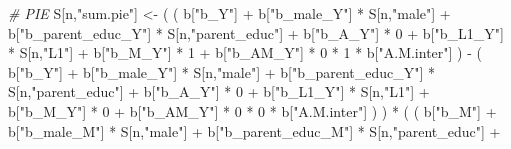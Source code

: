 \documentclass[
]{book}
\newenvironment{Shaded}{\begin{snugshade}}{\end{snugshade}}
\newcommand{\CommentTok}[1]{\textcolor[rgb]{0.56,0.35,0.01}{\textit{#1}}}
\newcommand{\DecValTok}[1]{\textcolor[rgb]{0.00,0.00,0.81}{#1}}
\newcommand{\NormalTok}[1]{#1}
\newcommand{\OtherTok}[1]{\textcolor[rgb]{0.56,0.35,0.01}{#1}}
\newcommand{\SpecialCharTok}[1]{\textcolor[rgb]{0.00,0.00,0.00}{#1}}
\newcommand{\StringTok}[1]{\textcolor[rgb]{0.31,0.60,0.02}{#1}}
\begin{document}
\begin{Shaded}
\begin{Highlighting}[]
    \CommentTok{\# PIE }
\NormalTok{    S[n,}\StringTok{"sum.pie"}\NormalTok{] }\OtherTok{\textless{}{-}}\NormalTok{ ( ( b[}\StringTok{"b\_Y"}\NormalTok{] }\SpecialCharTok{+} 
\NormalTok{                            b[}\StringTok{"b\_male\_Y"}\NormalTok{] }\SpecialCharTok{*}\NormalTok{ S[n,}\StringTok{"male"}\NormalTok{] }\SpecialCharTok{+} 
\NormalTok{                            b[}\StringTok{"b\_parent\_educ\_Y"}\NormalTok{] }\SpecialCharTok{*}\NormalTok{ S[n,}\StringTok{"parent\_educ"}\NormalTok{] }\SpecialCharTok{+} 
\NormalTok{                            b[}\StringTok{"b\_A\_Y"}\NormalTok{] }\SpecialCharTok{*} \DecValTok{0} \SpecialCharTok{+} 
\NormalTok{                            b[}\StringTok{"b\_L1\_Y"}\NormalTok{] }\SpecialCharTok{*}\NormalTok{ S[n,}\StringTok{"L1"}\NormalTok{] }\SpecialCharTok{+}
\NormalTok{                            b[}\StringTok{"b\_M\_Y"}\NormalTok{] }\SpecialCharTok{*} \DecValTok{1} \SpecialCharTok{+}
\NormalTok{                            b[}\StringTok{"b\_AM\_Y"}\NormalTok{] }\SpecialCharTok{*} \DecValTok{0} \SpecialCharTok{*} \DecValTok{1} \SpecialCharTok{*}\NormalTok{ b[}\StringTok{"A.M.inter"}\NormalTok{] ) }\SpecialCharTok{{-}} 
\NormalTok{                          ( b[}\StringTok{"b\_Y"}\NormalTok{] }\SpecialCharTok{+} 
\NormalTok{                              b[}\StringTok{"b\_male\_Y"}\NormalTok{] }\SpecialCharTok{*}\NormalTok{ S[n,}\StringTok{"male"}\NormalTok{] }\SpecialCharTok{+} 
\NormalTok{                              b[}\StringTok{"b\_parent\_educ\_Y"}\NormalTok{] }\SpecialCharTok{*}\NormalTok{ S[n,}\StringTok{"parent\_educ"}\NormalTok{] }\SpecialCharTok{+} 
\NormalTok{                              b[}\StringTok{"b\_A\_Y"}\NormalTok{] }\SpecialCharTok{*} \DecValTok{0} \SpecialCharTok{+} 
\NormalTok{                              b[}\StringTok{"b\_L1\_Y"}\NormalTok{] }\SpecialCharTok{*}\NormalTok{ S[n,}\StringTok{"L1"}\NormalTok{] }\SpecialCharTok{+}
\NormalTok{                              b[}\StringTok{"b\_M\_Y"}\NormalTok{] }\SpecialCharTok{*} \DecValTok{0} \SpecialCharTok{+}
\NormalTok{                              b[}\StringTok{"b\_AM\_Y"}\NormalTok{] }\SpecialCharTok{*} \DecValTok{0} \SpecialCharTok{*} \DecValTok{0} \SpecialCharTok{*}\NormalTok{ b[}\StringTok{"A.M.inter"}\NormalTok{] ) ) }\SpecialCharTok{*}
\NormalTok{      ( ( b[}\StringTok{"b\_M"}\NormalTok{] }\SpecialCharTok{+} 
\NormalTok{            b[}\StringTok{"b\_male\_M"}\NormalTok{] }\SpecialCharTok{*}\NormalTok{ S[n,}\StringTok{"male"}\NormalTok{] }\SpecialCharTok{+} 
\NormalTok{            b[}\StringTok{"b\_parent\_educ\_M"}\NormalTok{] }\SpecialCharTok{*}\NormalTok{ S[n,}\StringTok{"parent\_educ"}\NormalTok{] }\SpecialCharTok{+} 

\end{Highlighting}
\end{Shaded}
\end{document}
